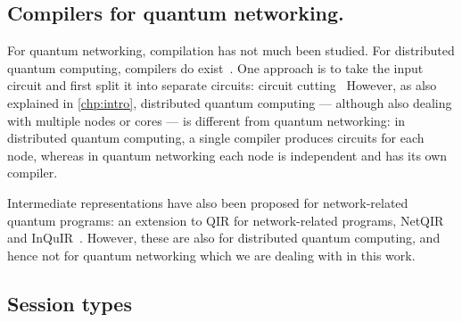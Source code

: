 


\subsection{Compilers for quantum networking.}
For quantum networking, compilation has not much been studied.
For distributed quantum computing, compilers do exist~\cite{ferrari_compiler_2021, chatterjee_qurzon_2022, cuomo_optimized_2023, ferrari_modular_2023}.
One approach is to take the input circuit and first split it into separate circuits: circuit cutting~\cite{chatterjee_qurzon_2022}
However, as also explained in \cref{chp:intro}, distributed quantum computing --- although also dealing with multiple nodes or cores --- is different from quantum networking: in distributed quantum computing, a single compiler produces circuits for each node, whereas in quantum networking each node is independent and has its own compiler.

Intermediate representations have also been proposed for network-related quantum programs:
an extension to QIR for network-related programs, NetQIR~\cite{vazquez-perez_netqir_2024} and InQuIR~\cite{nishio_inquir_2023}. However, these are also for distributed quantum computing, and hence not for quantum networking which we are dealing with in this work.


\subsection{Session types}
\label{compiler:sec:session-types}

